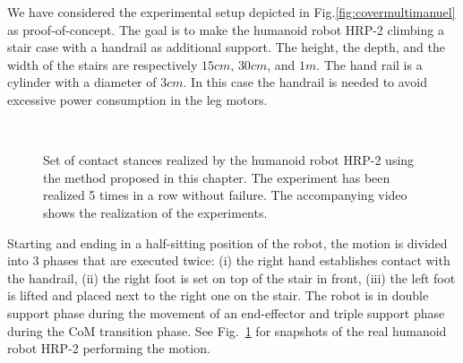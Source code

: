 We have considered the experimental setup depicted in Fig.\ref{fig:covermultimanuel} as proof-of-concept.
The goal is to make the humanoid robot HRP-2 climbing a stair case with a handrail as additional support.
The height, the depth, and the width of the stairs are respectively $15 cm$, $30 cm$, and $1 m$.
The hand rail is a cylinder with a diameter of $ 3 cm $.
In this case the handrail is needed to avoid excessive power consumption in the leg motors.
\begin{figure}[ht]
 \hfill
{} \hfill
{} \hfill
{} \\
\vspace*{-0.8cm}
\begin{center}
 \hspace*{0.8cm}
 \hspace*{0.8cm}
\end{center}
    \caption{
        Set of contact stances realized by the humanoid robot HRP-2 using the method proposed in this chapter.
        The experiment has been realized 5 times in a row without failure.
        The accompanying video shows the realization of the experiments.
    }
\label{fig:contact_stances}
\end{figure}
%
Starting and ending in a half-sitting position of the robot, the motion is divided into $3$ phases that are executed twice:
(i) the right hand establishes contact with the handrail,
(ii) the right foot is set on top of the stair in front,
(iii) the left foot is lifted and placed next to the right one on the stair.
The robot is in double support phase during the movement of an end-effector and triple support phase during the CoM transition phase.
See Fig.~\ref{fig:contact_stances} for snapshots of the real humanoid robot HRP-2 performing the motion.
%
%

